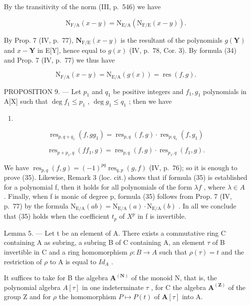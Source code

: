 By the transitivity of the norm (III, p.~546) we have

\[
\mathrm{N} _ {\mathrm{F/A}} (x - y) = \mathrm{N} _ {\mathrm{E/A}} (\mathrm{N} _ {\mathrm{F/E}} (x - y)).\tag{34}
\]

By Prop. 7 (IV, p.~77), \(\mathbf{N}_{\mathrm{F / E}}(x - y)\) is the resultant of the polynomials \(g(\mathbf{Y})\) and \(x - \mathbf{Y}\) in E{[}Y{]}, hence equal to \(g(x)\) (IV, p.~78, Cor. 3). By formula (34) and Prop. 7 (IV, p.~77) we thus have

\[
\mathrm{N} _ {\mathrm{F/A}} (x - y) = \mathrm{N} _ {\mathrm{E/A}} (g (x)) = \operatorname{res} (f, g).
\]

PROPOSITION 9. --- Let \(p_1\) and \(q_1\) be positive integers and \(f_1, g_1\) polynomials in A{[}X{]} such that \(\deg f_1 \leqslant p_1\) , \(\deg g_1 \leqslant q_1\) ; then we have

\begin{enumerate}
\def\labelenumi{(\arabic{enumi})}
\setcounter{enumi}{34}
\tightlist
\item
\end{enumerate}

\[
\operatorname{res} _ {p, q + q _ {1}} (f, g g _ {1}) = \operatorname{res} _ {p, q} (f, g) \cdot \operatorname{res} _ {p, q _ {1}} (f, g _ {1})\tag{36}
\]

\[
\operatorname{res} _ {p + p _ {1}, q} (f f _ {1}, g) = \operatorname{res} _ {p, q} (f, g) \cdot \operatorname{res} _ {p _ {1}, q} (f _ {1}, g).
\]

We have \(\operatorname{res}_{p,q}(f,g)=(-1)^{pq}\operatorname{res}_{q,p}(g,f)\) (IV, p.~76); so it is enough to prove (35). Likewise, Remark 3 (loc. cit.) shows that if formula (35) is established for a polynomial f, then it holds for all polynomials of the form \(\lambda f\) , where \(\lambda\in A\) . Finally, when f is monic of degree p, formula (35) follows from Prop. 7 (IV, p.~77) by the formula \(\mathrm{N}_{\mathrm{E}/\mathrm{A}}(ab)=\mathrm{N}_{\mathrm{E}/\mathrm{A}}(a)\cdot\mathrm{N}_{\mathrm{E}/\mathrm{A}}(b)\) . In all we conclude that (35) holds when the coefficient \(t_{p}\) of \(X^{p}\) in f is invertible.

Lemma 5. --- Let t be an element of A. There exists a commutative ring C containing A as subring, a subring B of C containing A, an element \(\tau\) of B invertible in C and a ring homomorphism \(\rho: B \to A\) such that \(\rho(\tau) = t\) and the restriction of \(\rho\) to A is equal to \(Id_{A}\) .

It suffices to take for B the algebra \(\mathbf{A}^{(\mathbf{N})}\) of the monoid N, that is, the polynomial algebra \(A[\tau]\) in one indeterminate \(\tau\) , for C the algebra \(\mathbf{A}^{(\mathbf{Z})}\) of the group Z and for \(\rho\) the homomorphism \(P \mapsto P(t)\) of \(\mathbf{A}[\tau]\) into A.

